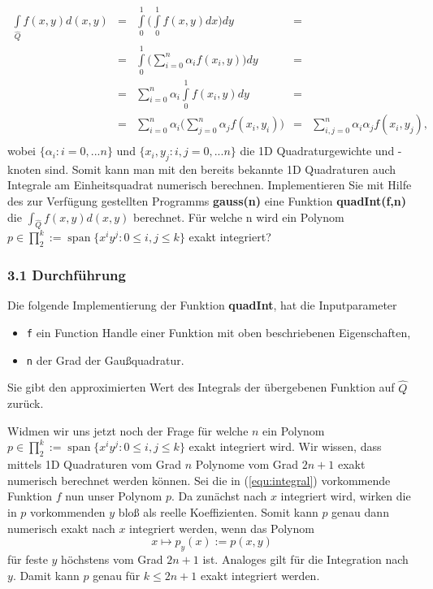 \documentclass[a4paper,11pt,bibliography=totoc,listof=totoc,headinclude=true,cleardoublepage=empty,oneside]{scrbook}
\newcommand{\code}[1]{\texttt{\color{change}#1}}
\DeclareMathOperator*{\SPAN}{span}
\begin{document}
\begin{equation}\label{equ:integral}
\begin{array}{rccll}
	\int\limits_{\hat{Q}}f(x,y)d(x,y)&=&\int\limits_{0}^{1}\Big(\int\limits_{0}^{1}f(x,y)dx\Big)dy&=&\\
	&=&\int\limits_0^{1}\Big(\sum\limits_{i=0}^n\alpha_i f(x_i,y)\Big)dy &=&\\ 
	&=&\sum\limits_{i=0}^n \alpha_i \int\limits_0^{1} f(x_i,y)dy&=&\\
	&=&\sum\limits_{i=0}^{n} \alpha_i\Big(\sum\limits_{j=0}^{n} \alpha_j f(x_i,y_i)\Big)&=&\sum\limits_{i,j=0}^{n} \alpha_i\alpha_j f(x_i,y_j),\\
\end{array}
\end{equation}
wobei $\{\alpha_i: i=0,...n\}$ und  $\{x_i,y_j : i,j=0,...n\}$ die 1D Quadraturgewichte und -knoten sind. Somit kann man mit den bereits bekannte 1D Quadraturen auch Integrale am Einheitsquadrat numerisch berechnen. Implementieren Sie mit Hilfe des zur Verfügung gestellten Programms \textbf{gauss(n)} eine Funktion \textbf{quadInt(f,n)} die $\int_{\hat{Q}}f(x,y)d(x,y) $ berechnet. Für welche n wird ein Polynom $ p \in \prod_{2}^k:=\SPAN\{x^iy^j:0 \leq i,j\leq k \} $ exakt integriert?

\subsubsection{3.1 Durchführung}

Die folgende Implementierung der Funktion \textbf{quadInt}, hat die Inputparameter
\begin{itemize}
	\item \code{f} ein Function Handle einer Funktion mit oben beschriebenen Eigenschaften,
	\item \code{n} der Grad der Gaußquadratur.
\end{itemize} 
Sie gibt den approximierten Wert des Integrals der übergebenen Funktion auf $\hat{Q}$ zurück.
{
	\color{change}		
 
		
%
}
Widmen wir uns jetzt noch der Frage für welche $n$ ein Polynom $ p \in \prod_{2}^k:=\SPAN\{x^iy^j:0 \leq i,j\leq k \} $ exakt integriert wird.		
Wir wissen, dass mittels 1D Quadraturen vom Grad $n$ Polynome vom Grad $2n+1$ exakt numerisch berechnet werden können. Sei die in (\ref{equ:integral}) vorkommende Funktion $f$ nun unser Polynom $p$. Da zunächst nach $x$ integriert wird, wirken die in $p$ vorkommenden $y$ bloß als reelle Koeffizienten. Somit kann $p$ genau dann numerisch exakt nach $x$ integriert werden, wenn das Polynom
\begin{equation*}
	x \mapsto p_y(x) := p(x,y)
\end{equation*}
für feste $y$ höchstens vom Grad $2n+1$ ist. Analoges gilt für die Integration nach $y$. Damit kann $p$ genau für $k \leq 2n+1$ exakt integriert werden.
\end{document}
